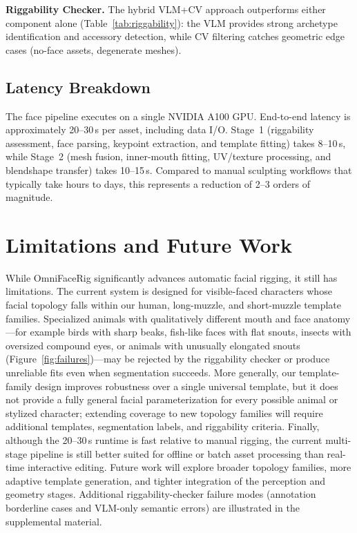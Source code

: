 \documentclass[acmtog,anonymous,review]{acmart}
\begin{document}
\textbf{Riggability Checker.} The hybrid VLM+CV approach outperforms either component alone (Table~\ref{tab:riggability}): the VLM provides strong archetype identification and accessory detection, while CV filtering catches geometric edge cases (no-face assets, degenerate meshes).


\subsection{Latency Breakdown}
\label{sec:latency}

The face pipeline executes on a single NVIDIA A100 GPU. End-to-end latency is approximately 20--30\,s per asset, including data I/O. Stage~1 (riggability assessment, face parsing, keypoint extraction, and template fitting) takes 8--10\,s, while Stage~2 (mesh fusion, inner-mouth fitting, UV/texture processing, and blendshape transfer) takes 10--15\,s. Compared to manual sculpting workflows that typically take hours to days, this represents a reduction of 2--3 orders of magnitude.


\section{Limitations and Future Work}
\label{sec:limitations}

While OmniFaceRig significantly advances automatic facial rigging, it still has limitations. The current system is designed for visible-faced characters whose facial topology falls within our human, long-muzzle, and short-muzzle template families. Specialized animals with qualitatively different mouth and face anatomy---for example birds with sharp beaks, fish-like faces with flat snouts, insects with oversized compound eyes, or animals with unusually elongated snouts (Figure~\ref{fig:failures})---may be rejected by the riggability checker or produce unreliable fits even when segmentation succeeds. More generally, our template-family design improves robustness over a single universal template, but it does not provide a fully general facial parameterization for every possible animal or stylized character; extending coverage to new topology families will require additional templates, segmentation labels, and riggability criteria. Finally, although the 20--30\,s runtime is fast relative to manual rigging, the current multi-stage pipeline is still better suited for offline or batch asset processing than real-time interactive editing. Future work will explore broader topology families, more adaptive template generation, and tighter integration of the perception and geometry stages. Additional riggability-checker failure modes (annotation borderline cases and VLM-only semantic errors) are illustrated in the supplemental material.
\end{document}
